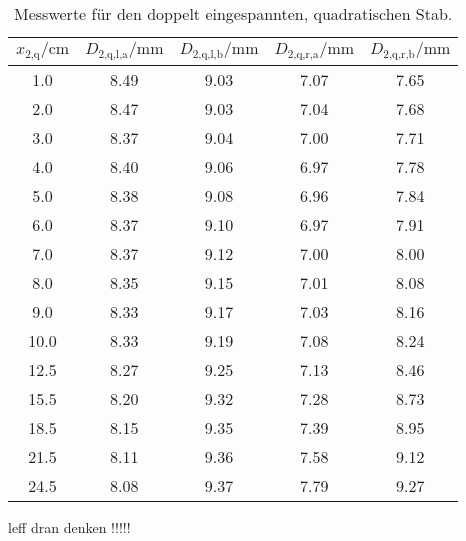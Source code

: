 \begin{table}[h]
  \centering
  \caption{Messwerte für den doppelt eingespannten, quadratischen Stab.}
  \label{tab:Quadzwei}
  \begin{tabular}{c c c c c}
    \toprule
    $x_\text{2,q}/\si{\centi\meter}$ & $D_\text{2,q,l,a}/\si{\milli\meter}$ &
    $D_\text{2,q,l,b}/\si{\milli\meter}$ & $D_\text{2,q,r,a}/\si{\milli\meter}$
    & $D_\text{2,q,r,b}/\si{\milli\meter}$\\
    \midrule
    1.0 & 8.49 & 9.03 & 7.07 & 7.65 \\
    2.0 & 8.47 & 9.03 & 7.04 & 7.68 \\
    3.0 & 8.37 & 9.04 & 7.00 & 7.71 \\
    4.0 & 8.40 & 9.06 & 6.97 & 7.78 \\
    5.0 & 8.38 & 9.08 & 6.96 & 7.84 \\
    6.0 & 8.37 & 9.10 & 6.97 & 7.91 \\
    7.0 & 8.37 & 9.12 & 7.00 & 8.00 \\
    8.0 & 8.35 & 9.15 & 7.01 & 8.08 \\
    9.0 & 8.33 & 9.17 & 7.03 & 8.16 \\
    10.0 & 8.33 & 9.19 & 7.08 & 8.24 \\
    12.5 & 8.27 & 9.25 & 7.13 & 8.46 \\
    15.5 & 8.20 & 9.32 & 7.28 & 8.73 \\
    18.5 & 8.15 & 9.35 & 7.39 & 8.95 \\
    21.5 & 8.11 & 9.36 & 7.58 & 9.12 \\
    24.5 & 8.08 & 9.37 & 7.79 & 9.27 \\
    \bottomrule
  \end{tabular}
\end{table}


leff dran denken !!!!!
